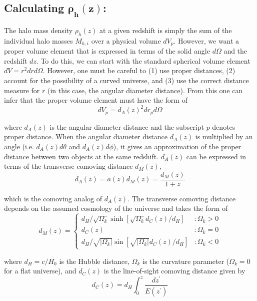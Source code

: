 \documentclass[%
 reprint,
 amsmath,amssymb,
 aps,nofootinbib
]{revtex4-1}
\begin{document}
\subsection*{Calculating $\mathbf{\rho_h(z)}$:}

The halo mass density $\rho_h(z)$ at a given redshift is simply the sum of the individual halo masses $M_{h,i}$ over a physical volume $dV_p$. However, we want a proper volume element that is expressed in terms of the solid angle $d\Omega$ and the redshift $dz$. To do this, we can start with the standard spherical volume element $dV=r^2drd\Omega$. However, one must be careful to (1) use proper distances, (2) account for the possibility of a curved universe, and (3) use the correct distance measure for $r$ (in this case, the angular diameter distance). From this one can infer that the proper volume element must have the form of
\begin{equation}\label{proper_element}
dV_p=d_A(z)^2dr_pd\Omega
\end{equation}

\noindent where $d_A(z)$ is the angular diameter distance and the subscript $p$ denotes proper distance. When the angular diameter distance $d_A(z)$ is multiplied by an angle (i.e. $d_A(z)d\theta$ and $d_A(z)d\phi$), it gives an approximation of the proper distance between two objects at the same redshift. $d_A(z)$ can be expressed in terms of the transverse comoving distance $d_M(z)$,
\begin{equation}\label{angular2transverse}
d_A(z)=a(z)d_M(z)=\frac{d_M(z)}{1+z}
\end{equation}

\noindent which is the comoving analog of $d_A(z)$. The transverse comoving distance depends on the assumed cosmology of the universe and takes the form of
\begin{equation}\label{comoving_transverse}
d_M(z)=\left\{
     \begin{array}{lr}
       d_H/\sqrt{\Omega_k}\sinh\left[\sqrt{\Omega_k}d_C(z)/d_H\right] & : \Omega_k>0\\
       d_C(z) & : \Omega_k=0\\
       d_H/\sqrt{|\Omega_k|}\sin\left[\sqrt{|\Omega_k|}d_C(z)/d_H\right] & : \Omega_k<0
     \end{array}
   \right.
\end{equation}

\noindent where $d_H=c/H_0$ is the Hubble distance, $\Omega_k$ is the curvature parameter ($\Omega_k=0$ for a flat universe), and $d_C(z)$ is the line-of-sight comoving distance given by
\begin{equation}\label{comoving_distance}
d_C(z)=d_H\int_0^z\frac{dz^\prime}{E(z^\prime)}
\end{equation}
\end{document}
